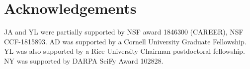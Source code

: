 \documentclass{article}
\begin{document}










\section*{Acknowledgements}

JA and YL were partially supported by NSF award 1846300 (CAREER), NSF CCF-1815893. AD was supported by a Cornell University Graduate Fellowship. YL was also supported by a Rice University Chairman postdoctoral fellowship. NY was supported by DARPA  SciFy Award 102828.



\end{document}

